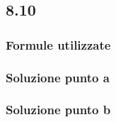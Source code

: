 \documentclass[../../main.tex]{subfiles}
\begin{document}
\subsection*{8.10}
\subsubsection*{Formule utilizzate}
\subsubsection*{Soluzione punto a}
\subsubsection*{Soluzione punto b}
\newpage
\end{document}
